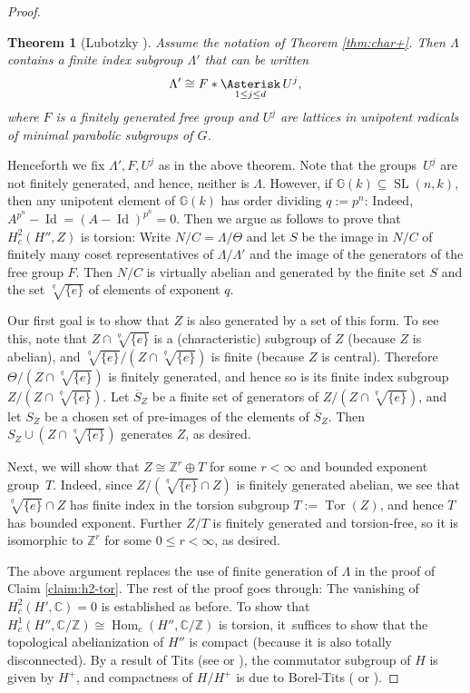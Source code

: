 \documentclass[JEP,XML,SOM,Unicode,published]{cedram}
\newcommand{\bbC}{\ensuremath{\mathbb{C}}}
\newcommand{\bbG}{\ensuremath{\mathbb{G}}}
\newcommand{\bbZ}{\ensuremath{\mathbb{Z}}}
\DeclareMathOperator{\Id}{Id}
\DeclareMathOperator{\Hom}{Hom}
\DeclareMathOperator{\SL}{SL}
\DeclareMathOperator{\Tor}{Tor}
\newtheorem{thm}{Theorem}[section]
\theoremstyle{definition}
\begin{document}
\begin{proof}
\begin{thm}[{Lubotzky \cite[Th.\,2]{lubotzky-char+}}]\label{thm:lubotzky-char+}
Assume the notation of Theorem \ref{thm:char+}. Then $\Lambda$ contains a finite index subgroup $\Lambda'$ that can be written
\[
\Lambda' \cong F \ast \mathop{\Asterisk}_{1\leq j\leq d} U^j,
\]
where $F$ is a finitely generated free group and $U^j$ are lattices in unipotent radicals of minimal parabolic subgroups of $G$.
\end{thm}

Henceforth we fix $\Lambda', F, U^j$ as in the above theorem. Note that the groups~$U^j$ are not finitely generated, and hence, neither is $\Lambda$. However, if $\bbG(k)\subseteq \SL(n,k)$, then any unipotent element of $\bbG(k)$ has order dividing $q\!:=\!p^n$: Indeed, \hbox{$A^{p^n}\!\!-\Id \!=\! (A-\Id)^{p^n}\!=\!0$}. Then we argue as follows to prove that $H^2_c(H'',Z)$ is torsion: Write $N/C=\Lambda/\Theta$ and let $S$ be the image in $N/C$ of finitely many coset representatives of $\Lambda/\Lambda'$ and the image of the generators of the free group $F$. Then $N/C$ is virtually abelian and generated by the finite set $S$ and the set $\sqrt[q]{\{e\}}$ of elements of exponent $q$.

Our first goal is to show that $Z$ is also generated by a set of this form. To see this, note that $Z\cap \sqrt[q]{\{e\}}$ is a (characteristic) subgroup of $Z$ (because $Z$ is abelian), and $\sqrt[q]{\{e\}}/(Z\cap \sqrt[q]{\{e\}})$ is finite (because $Z$ is central). Therefore $\Theta/(Z\cap \sqrt[q]{\{e\}})$ is finitely generated, and hence so is its finite index subgroup $Z/(Z\cap \sqrt[q]{\{e\}})$. Let $\overline{S}_Z$ be a finite set of generators of $Z/(Z\cap \sqrt[q]{\{e\}})$, and let $S_Z$ be a chosen set of pre-images of the elements of $\overline{S}_Z$. Then $S_Z\cup (Z\cap \sqrt[q]{\{e\}})$ generates $Z$, as desired.

Next, we will show that $Z\cong \bbZ^r\oplus T$ for some $r<\infty$ and bounded exponent group~$T$. Indeed, since $Z/(\sqrt[q]{\{e\}}\cap Z)$ is finitely generated abelian, we see that $\sqrt[q]{\{e\}}\cap Z$ has finite index in the torsion subgroup $T:=\Tor(Z)$, and hence $T$ has bounded exponent. Further $Z/T$ is finitely generated and torsion-free, so it is isomorphic to $\bbZ^r$ for some $0\leq r<\infty$, as desired.

The above argument replaces the use of finite generation of $\Lambda$ in the proof of Claim \ref{claim:h2-tor}. The rest of the proof goes through: The vanishing of $H^2_c(H',\bbC)=0$ is established as before. To show that $H^1_c(H'',\bbC/\bbZ)\cong \Hom_c(H'',\bbC/\bbZ)$ is torsion, it~suffices to show that the topological abelianization of $H''$ is compact (because it is also totally disconnected). By a result of Tits (see \cite{tits-simple} or \cite[Th.\,I.1.5.6(ii)]{margulis-book}), the commutator subgroup of $H$ is given by $H^+$, and compactness of $H/H^+$ is due to Borel-Tits (\cite[6.14]{borel-tits-morphismes-abstraits} or \cite[I.2.3.1(b)]{margulis-book}).


\end{proof}
\end{document}
